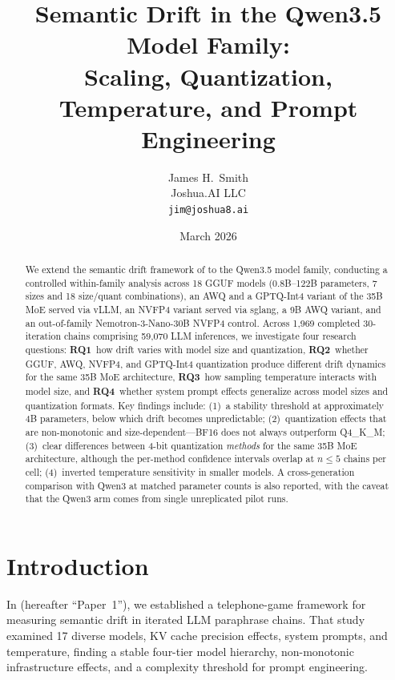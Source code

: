 \documentclass[11pt]{article}
\title{Semantic Drift in the Qwen3.5 Model Family:\\
Scaling, Quantization, Temperature, and Prompt Engineering}
\author{
  James H.\ Smith \\
  Joshua.AI LLC \\
  \texttt{jim@joshua8.ai}
}
\date{March 2026}
\begin{document}
\maketitle

\begin{abstract}
We extend the semantic drift framework of \citet{smith2026semantic} to the
Qwen3.5 model family, conducting a controlled within-family analysis across
18 GGUF models (0.8B--122B parameters, 7 sizes and 18 size/quant
combinations), an AWQ and a GPTQ-Int4 variant of the 35B MoE served via
vLLM, an NVFP4 variant served via sglang, a 9B AWQ variant, and an
out-of-family Nemotron-3-Nano-30B NVFP4 control.
Across 1{,}969 completed 30-iteration chains comprising 59{,}070 LLM
inferences, we investigate four research questions:
\textbf{RQ1}~how drift varies with model size and quantization,
\textbf{RQ2}~whether GGUF, AWQ, NVFP4, and GPTQ-Int4 quantization produce
different drift dynamics for the same 35B MoE architecture,
\textbf{RQ3}~how sampling temperature interacts with model size, and
\textbf{RQ4}~whether system prompt effects generalize across model sizes
and quantization formats.
Key findings include:
(1)~a stability threshold at approximately 4B parameters, below which drift
becomes unpredictable;
(2)~quantization effects that are non-monotonic and size-dependent---BF16
does not always outperform Q4\_K\_M;
(3)~clear differences between 4-bit quantization \emph{methods} for the same
35B MoE architecture, although the per-method confidence intervals overlap
at $n\leq5$ chains per cell;
(4)~inverted temperature sensitivity in smaller models.
A cross-generation comparison with Qwen3 at matched parameter counts is
also reported, with the caveat that the Qwen3 arm comes from single
unreplicated pilot runs.
\end{abstract}

\section{Introduction}
\label{sec:intro}

In \citet{smith2026semantic} (hereafter ``Paper~1''), we established a
telephone-game framework for measuring semantic drift in iterated LLM
paraphrase chains. That study examined 17 diverse models, KV cache precision
effects, system prompts, and temperature, finding a stable four-tier model
hierarchy, non-monotonic infrastructure effects, and a complexity threshold
for prompt engineering.
\end{document}
